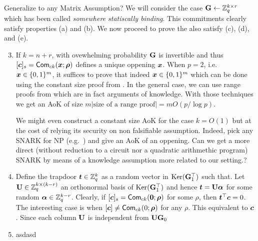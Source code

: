 {\color{red} Generalize to any Matrix Assumption?}
We will consider the case $\mathbf{{G}}\gets\mathbb{Z}_q^{k\times r}$ which has been called \emph{somewhere statiscally binding}. 
This commitments clearly satisfy properties (a) and (b). We now proceed to prove the also satisfy (c), (d), and (e).
\begin{enumerate}[label=(\alph*)]
\setcounter{enumi}{2}
\item If $k=n+r$, with ovewhelming probability $\mathbf{{G}}$ is invertible and thus $[{\boldsymbol{c}}]_s=\mathsf{Com}_{ck}({\boldsymbol{x}};{\boldsymbol{\rho}})$ defines a unique oppening ${\boldsymbol{x}}$. When $p=2$, i.e.~${\boldsymbol{x}}\in\{0,1\}^m$, it suffices to prove that indeed ${\boldsymbol{x}}\in\{0,1\}^m$ which can be done using the constant size proof from \cite{AC:GonHevRaf15}. In the general case, we can use range proofs from \cite{ACNS:GonRaf16} which are in fact arguments of knowledge. With those techniques we get an AoK of size $m|\text{size of a range proof}|=mO(p/\log p)$.

We might even construct a constant size AoK for the case $k=O(1)$ but at the cost of relying its security on non falsifiable assumption. Indeed, pick any SNARK for NP (e.g.~\cite{EC:Groth17}) and give an AoK of an oppening. {\color{red} Can we get a more direct (without reduction to a circuit nor a quadratic arithmethic program) SNARK by means of a knowledge assumption more related to our setting.?}
\item Define the trapdoor ${\boldsymbol{t}}\in\mathbb{Z}_q^k$ as a random vector in $\mathrm{Ker}(\mathbf{{G}}_1^\top)$ such that. Let $\mathbf{{U}}\in\mathbb{Z}_q^{k\times(k-r)}$ an orthonormal basis of $\mathrm{Ker}(\mathbf{{G}}_1^\top)$ and hence ${\boldsymbol{t}}=\mathbf{{U}}{\boldsymbol{\alpha}}$ for some random ${\boldsymbol{\alpha}}\in\mathbb{Z}_q^{k-r}$. Clearly, if $[{\boldsymbol{c}}]_s=\mathsf{Com}_{ck}({\boldsymbol{0}};{\boldsymbol{\rho}})$ for some $\rho$, then ${\boldsymbol{t}}^\top{\boldsymbol{c}}=0$. The interesting case is when $[{\boldsymbol{c}}]\neq\mathsf{Com}_{ck}(0;{\boldsymbol{\rho}})$ for any $\rho$. This equivalent to ${\boldsymbol{c}}$. Since each column $\mathbf{{U}}$ is independent from $\mathbf{{U}}\mathbf{{G}}_0$
\item asdasd
\end{enumerate}
